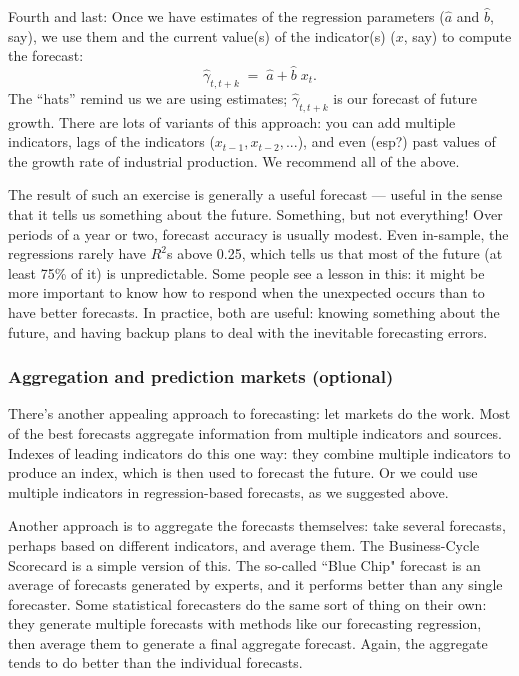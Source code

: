 \documentclass[letterpaper,12pt]{article}
\begin{document}
Fourth and last:
Once we have estimates of the regression
parameters ($\widehat{a}$ and $\widehat{b}$, say),
we use them and the current value(s)
of the indicator(s) ($x$, say)
to compute the forecast:
\[
        \widehat{\gamma}_{t,t+k}  \;=\;  \widehat{a} + \widehat{b} \; x_t .
\]
The ``hats'' remind us we are using estimates;
$\widehat{\gamma}_{t,t+k}$ is our forecast of future growth.
There are lots of variants of this approach:
you can add multiple indicators,
lags of the indicators  ($x_{t-1}, x_{t-2}, ...$),
and even (esp?) past values of the growth rate of industrial
production.
We recommend all of the above.


The result of such an exercise is generally a useful forecast ---
useful in the sense that it tells us something about the future.
Something, but not everything!
Over periods of a year or two, forecast accuracy is usually modest.
Even in-sample, the regressions rarely have $R^2$s above 0.25,
which tells us that most of the future (at least 75\% of it)
is unpredictable.
Some people see a lesson in this:  it might be more important
to know how to respond when the unexpected occurs
than to have better forecasts.
In practice, both are useful:  knowing something about the future,
and having backup plans to deal with the inevitable forecasting errors.


\subsubsection*{Aggregation and prediction markets (optional)}

There's another appealing approach to forecasting:
let markets do the work.
Most of the best forecasts aggregate information from multiple
indicators and sources.
Indexes of leading indicators do this one way:  they
combine multiple indicators to produce an index, which is then used
to forecast the future.
Or we could use multiple indicators in regression-based forecasts,
as we suggested above.

Another approach is to aggregate the forecasts themselves:
take several forecasts, perhaps based on different indicators,
and average them.
The Business-Cycle Scorecard is a simple version of this.
The so-called ``Blue Chip" forecast is an average of forecasts generated by experts, and it performs better than any single forecaster.
Some statistical forecasters do the same sort of thing on their own:
they generate multiple forecasts with methods like our forecasting regression,
then average them to generate a final aggregate forecast. Again,
the aggregate tends to do better than the individual forecasts.
\end{document}
